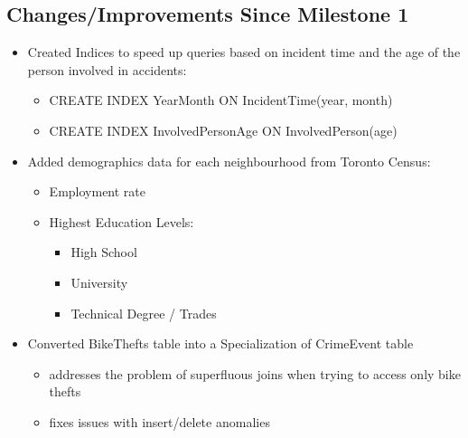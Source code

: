 \documentclass[12pt, a4paper]{article}
\begin{document}
\subsection*{Changes/Improvements Since Milestone 1}
\begin{itemize}
    \item Created Indices to speed up queries based on incident time and the age of the person involved in accidents:
    \begin{itemize}
        \item CREATE INDEX YearMonth ON IncidentTime(year, month)
        \item CREATE INDEX InvolvedPersonAge ON InvolvedPerson(age)
    \end{itemize}
    \item Added demographics data for each neighbourhood from Toronto Census:
    \begin{itemize}
        \item Employment rate %
        \item Highest Education Levels:
        \begin{itemize}
            \item High School %
            \item University %
            \item Technical Degree / Trades %
        \end{itemize}
    \end{itemize}
    \item Converted BikeThefts table into a Specialization of CrimeEvent table
    \begin{itemize}
        \item addresses the problem of superfluous joins when trying to access only bike thefts
        \item fixes issues with insert/delete anomalies
    \end{itemize}
\end{itemize}
\end{document}
